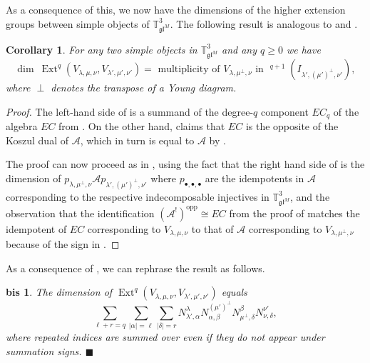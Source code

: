 \documentclass[11pt]{article}
\theoremstyle{plain}
\newtheorem{corollary}[lemma]{Corollary}
\theoremstyle{nonumberplain}
\newtheorem{corbis}{\Cref{cor.self-dual} bis}
\theoremstyle{plain}
\theoremstyle{nonumberplain}
\newtheorem{proof}{Proof}
\newcommand\bT{{\mathbb T}}
\newcommand\cA{{\mathcal A}}
\newcommand\fgl{\mathfrak{gl}}
\DeclareMathOperator{\Ext}{\mathrm{Ext}}
\DeclareMathOperator{\usoc}{\underline{\mathrm{soc}}}
\newcommand{\qedhere}{\mbox{}\hfill\ensuremath{\blacksquare}}
\begin{document}
As a consequence of this, we now have the dimensions of the higher extension groups between simple objects of $\bT^3_{\fgl^M}$. The following result is analogous to \cite[Corollary 6.5]{DPS} and \cite[Proposition 3.3.3]{SS}.







\begin{corollary}\label{cor.self-dual}
  For any two simple objects in $\bT^3_{\fgl^M}$ and any $q\ge 0$ we have
  \begin{equation}\label{eq.self-dual}
    \dim\ \Ext^q(V_{\lambda,\mu,\nu},V_{\lambda',\mu',\nu'}) = \text{ multiplicity of }V_{\lambda,\mu^\perp,\nu}\text{ in }\usoc^{q+1}(I_{\lambda',(\mu')^\perp,\nu'}),
  \end{equation}
where $\perp$ denotes the transpose of a Young diagram. 
\end{corollary}
\begin{proof}
The left-hand side of  is a summand of the degree-$q$ component $EC_q$ of the algebra $EC$ from . On the other hand, \cite[Theorem 2.10.1]{BGS} claims that $EC$ is the opposite of the Koszul dual of $\cA$, which in turn is equal to $\cA$ by . 

The proof can now proceed as in \cite[Corollary 6.5]{DPS}, using the fact that the right hand side of  is the dimension of $p_{\lambda,\mu^\perp,\nu}\cA p_{\lambda',(\mu')^\perp,\nu'}$ where $p_{\bullet,\bullet,\bullet}$ are the idempotents in $\cA$ corresponding to the respective indecomposable injectives in $\bT^3_{\fgl^M}$, and the observation that the identification $(\cA^!)^{\mathrm{opp}}\cong EC$ from the proof of  matches the idempotent of $EC$ corresponding to $V_{\lambda,\mu,\nu}$ to that of $\cA$ corresponding to $V_{\lambda,\mu^\perp,\nu}$ because of the sign in . 
\end{proof}


As a consequence of , we can rephrase the result as follows. 


\begin{corbis}
The dimension of $\Ext^q(V_{\lambda,\mu,\nu},V_{\lambda',\mu',\nu'})$
equals
  \begin{equation*}
        \sum_{\ell+r=q} \sum_{|\alpha|=\ell} \sum_{|\delta|=r}
        N_{\lambda',\alpha}^\lambda
        N_{\alpha,\beta}^{(\mu')^\perp}N_{{\mu^\perp},\delta}^{\beta}N_{\nu,\delta}^{\nu'},
  \end{equation*}
where repeated indices are summed over even if they do not appear under summation signs. 
\qedhere  
\end{corbis}
\end{document}
